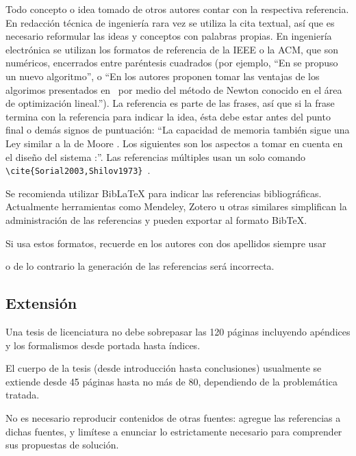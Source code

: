  Todo concepto o idea tomado de otros
autores contar con la respectiva referencia. En redacción técnica de
ingeniería rara vez se utiliza la cita textual, así que es necesario
reformular las ideas y conceptos con palabras propias. En ingeniería
electrónica se utilizan los formatos de referencia de la IEEE o la
ACM, que son numéricos, encerrados entre paréntesis cuadrados (por
ejemplo, ``En \cite{Davis1963} se propuso un nuevo algoritmo'', o ``En
\cite{ProakisManolakis1998} los autores proponen tomar las ventajas de
los algorimos presentados
en~\cite{Oppenheim1998,Roberts2005,Haykin2001} por medio del método de
Newton \cite{Burrus1998} conocido en el área de optimización
lineal.''). La referencia es parte de las frases, así que si la frase
termina con la referencia para indicar la idea, ésta debe estar antes
del punto final o demás signos de puntuación: ``La capacidad de
memoria también sigue una Ley similar a la de Moore \cite{Octave}. Los
siguientes son los aspectos a tomar en cuenta en el diseño del sistema
\cite{Lindner2002}:''.  Las referencias múltiples usan un solo comando
\verb|\cite{Sorial2003,Shilov1973}|~\cite{Soria2003,Shilov1973}.

Se recomienda utilizar BibLaTeX para indicar las referencias
bibliográficas.  Actualmente herramientas como Mendeley, Zotero u
otras similares simplifican la administración de las referencias y
pueden exportar al formato BibTeX.

Si usa estos formatos, recuerde en los autores con dos apellidos
siempre usar
\begin{center}
\end{center}
o de lo contrario la generación de las referencias será incorrecta.

\subsection{Extensión}

Una tesis de licenciatura no debe sobrepasar las 120 páginas incluyendo
apéndices y los formalismos desde portada hasta índices.

El cuerpo de la tesis (desde introducción hasta conclusiones) usualmente se
extiende desde 45 páginas hasta no más de 80, dependiendo de la problemática
tratada.

No es necesario reproducir contenidos de otras fuentes: agregue las referencias
a dichas fuentes, y limítese a enunciar lo estrictamente necesario para
comprender sus propuestas de solución.


